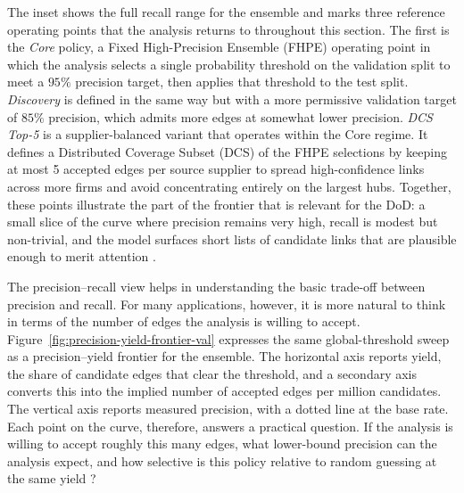 The inset shows the full recall range for the ensemble and marks three reference operating points that the analysis returns to throughout this section. The first is the \emph{Core} policy, a Fixed High-Precision Ensemble (FHPE) operating point in which the analysis selects a single probability threshold on the validation split to meet a \(95\%\) precision target, then applies that threshold to the test split. \emph{Discovery} is defined in the same way but with a more permissive validation target of \(85\%\) precision, which admits more edges at somewhat lower precision. \emph{DCS Top-5} is a supplier-balanced variant that operates within the Core regime. It defines a Distributed Coverage Subset (DCS) of the FHPE selections by keeping at most 5 accepted edges per source supplier to spread high-confidence links across more firms and avoid concentrating entirely on the largest hubs. Together, these points illustrate the part of the frontier that is relevant for the DoD: a small slice of the curve where precision remains very high, recall is modest but non-trivial, and the model surfaces short lists of candidate links that are plausible enough to merit attention \parencite{hand_measuring_2009}.

The precision--recall view helps in understanding the basic trade-off between precision and recall. For many applications, however, it is more natural to think in terms of the number of edges the analysis is willing to accept. Figure~\ref{fig:precision-yield-frontier-val} expresses the same global-threshold sweep as a precision--yield frontier for the ensemble. The horizontal axis reports yield, the share of candidate edges that clear the threshold, and a secondary axis converts this into the implied number of accepted edges per million candidates. The vertical axis reports measured precision, with a dotted line at the base rate. Each point on the curve, therefore, answers a practical question. If the analysis is willing to accept roughly this many edges, what lower-bound precision can the analysis expect, and how selective is this policy relative to random guessing at the same yield \parencite{manning_introduction_2008,davis_relationship_2006,hand_measuring_2009}?


